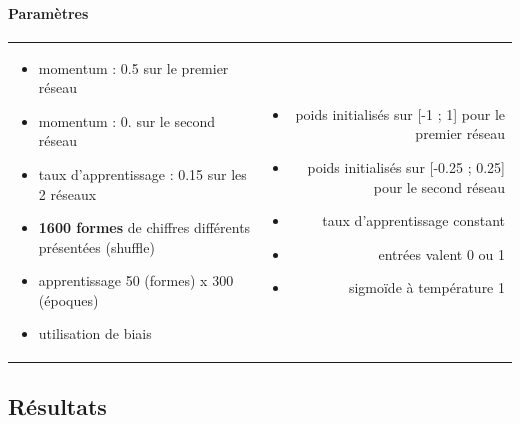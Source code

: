     \paragraph{Paramètres}
      \begin{center}
	\begin{tabular}{lr}
	  \begin{minipage}{230px}
	    \begin{itemize}
	      \item momentum : 0.5 sur le premier réseau
	      \item momentum : 0. sur le second réseau
	      \item taux d'apprentissage : 0.15 sur les 2 réseaux
	      \item \textbf{1600 formes} de chiffres différents présentées (shuffle) \cite{Handwritten_256}
	      \item apprentissage 50 (formes) x 300 (époques)
	      \item utilisation de biais
	      
	    \end{itemize}
	  \end{minipage}
	  &
	  \begin{minipage}{230px}
	    \begin{itemize}
	      \item poids initialisés sur [-1 ; 1] pour le premier réseau
	      \item poids initialisés sur [-0.25 ; 0.25] pour le second réseau
	      \item taux d'apprentissage constant
	      \item entrées valent 0 ou 1
	      \item sigmoïde à température 1
	    \end{itemize}
	  \end{minipage}
	\end{tabular}
      \end{center}


  
  \newpage
  \subsection{Résultats}
